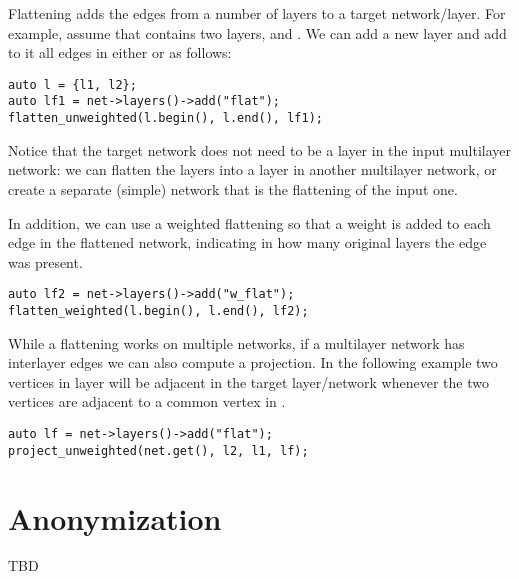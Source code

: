 Flattening adds the edges from a number of layers to a target network/layer. For example, assume that  contains two layers,  and . We can add a new layer  and add to it all edges in either  or  as follows:
\begin{lstlisting}[style=c++]
auto l = {l1, l2};
auto lf1 = net->layers()->add("flat");
flatten_unweighted(l.begin(), l.end(), lf1);
\end{lstlisting}
    
Notice that the target network does not need to be a layer in the input multilayer network: we can flatten the layers into a layer in another multilayer network, or create a separate (simple) network that is the flattening of the input one.

In addition, we can use a weighted flattening so that a weight is added to each edge in the flattened network, indicating in how many original layers the edge was present.
\begin{lstlisting}[style=c++]
auto lf2 = net->layers()->add("w_flat");
flatten_weighted(l.begin(), l.end(), lf2);
\end{lstlisting}

While a flattening works on multiple networks, if a multilayer network has interlayer edges we can also compute a projection. In the following example two vertices in layer  will be adjacent in the target layer/network  whenever the two vertices are adjacent to a common vertex in .
\begin{lstlisting}[style=c++]
auto lf = net->layers()->add("flat");
project_unweighted(net.get(), l2, l1, lf);
\end{lstlisting}
    

\section{Anonymization}

TBD